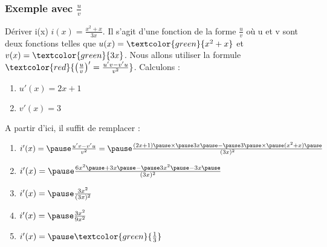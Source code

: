 \documentclass[t]{beamer}
\begin{document}
	\begin{frame}
		\frametitle{Exemple avec $\frac{u}{v}$ }
		\pause
		\begin{block}{Dériver i(x)}
			$i(x) = \frac{x^2 + x}{3x}$. \pause Il s'agit d'une fonction de la forme $\frac{u}{v}$ \pause où u et v sont deux fonctions \pause telles que $u(x) = \textcolor{green}{x^2 + x}$ \pause et $v(x) = \textcolor{green}{3x}$. \pause Nous allons utiliser la formule $\textcolor{red}{\left( \frac{u}{v} \right)' = \frac{u'v - v'u}{v^2}}$. \pause Calculons :
			\pause
			\begin{enumerate}{}
				\item<+-> \(u'(x)= 2x + 1 \)
				\item<+-> \(v'(x) = 3 \) 
			\end{enumerate}
			\pause
			A partir d'ici, il suffit de remplacer : \pause
			\begin{enumerate}[]
				\item \(i'(x) = \pause \frac{u'v - v'u}{v^2} = \pause \frac{(2x+1) \pause \times \pause 3x \pause - \pause 3 \pause \times \pause (x^2+x) \pause}{(3x)^2}\)
				\pause
				\item \(i'(x) = \pause \frac{6x^2 \pause + 3x \pause - \pause 3x^2 \pause - 3x \pause}{(3x)^2} \)
				\pause
				\item \(i'(x) = \pause \frac{3x^2}{(3x)^2} \)
				\pause
				\item \(i'(x) = \pause \frac{3x^2}{9x^2} \)
				\pause
				\item \(i'(x) = \pause \textcolor{green}{\frac{1}{3}} \)
			\end{enumerate}	
		\end{block}
	\end{frame}
\end{document}
